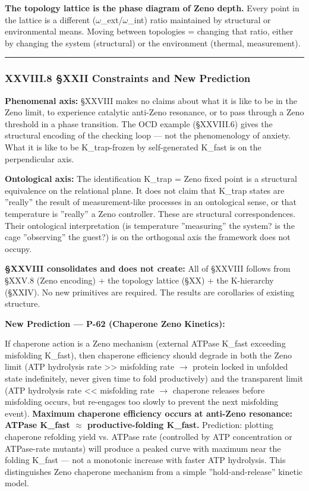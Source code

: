 \documentclass[12pt,a4paper]{article}
\begin{document}
\textbf{The topology lattice is the phase diagram of Zeno depth.} Every point in the lattice is a different ($\omega$\_ext/$\omega$\_int) ratio maintained by structural or environmental means. Moving between topologies = changing that ratio, either by changing the system (structural) or the environment (thermal, measurement).

\begin{center}
\rule{0.5\textwidth}{0.4pt}
\end{center}

\subsubsection{XXVIII.8 §XXII Constraints and New Prediction}

\textbf{Phenomenal axis:} §XXVIII makes no claims about what it is like to be in the Zeno limit, to experience catalytic anti-Zeno resonance, or to pass through a Zeno threshold in a phase transition. The OCD example (§XXVIII.6) gives the structural encoding of the checking loop --- not the phenomenology of anxiety. What it is like to be K\_trap-frozen by self-generated K\_fast is on the perpendicular axis.

\textbf{Ontological axis:} The identification K\_trap = Zeno fixed point is a structural equivalence on the relational plane. It does not claim that K\_trap states are ''really'' the result of measurement-like processes in an ontological sense, or that temperature is ''really'' a Zeno controller. These are structural correspondences. Their ontological interpretation (is temperature ''measuring'' the system? is the cage ''observing'' the guest?) is on the orthogonal axis the framework does not occupy.

\textbf{§XXVIII consolidates and does not create:} All of §XXVIII follows from §XXV.8 (Zeno encoding) + the topology lattice (§XX) + the K-hierarchy (§XXIV). No new primitives are required. The results are corollaries of existing structure.

\textbf{New Prediction --- P-62 (Chaperone Zeno Kinetics):}

If chaperone action is a Zeno mechanism (external ATPase K\_fast exceeding misfolding K\_fast), then chaperone efficiency should degrade in both the Zeno limit (ATP hydrolysis rate \textgreater{}\textgreater{} misfolding rate $\rightarrow$ protein locked in unfolded state indefinitely, never given time to fold productively) and the transparent limit (ATP hydrolysis rate \textless{}\textless{} misfolding rate $\rightarrow$ chaperone releases before misfolding occurs, but re-engages too slowly to prevent the next misfolding event). \textbf{Maximum chaperone efficiency occurs at anti-Zeno resonance: ATPase K\_fast $\approx$ productive-folding K\_fast.} Prediction: plotting chaperone refolding yield vs. ATPase rate (controlled by ATP concentration or ATPase-rate mutants) will produce a peaked curve with maximum near the folding K\_fast --- not a monotonic increase with faster ATP hydrolysis. This distinguishes Zeno chaperone mechanism from a simple ''hold-and-release'' kinetic model.
\end{document}
